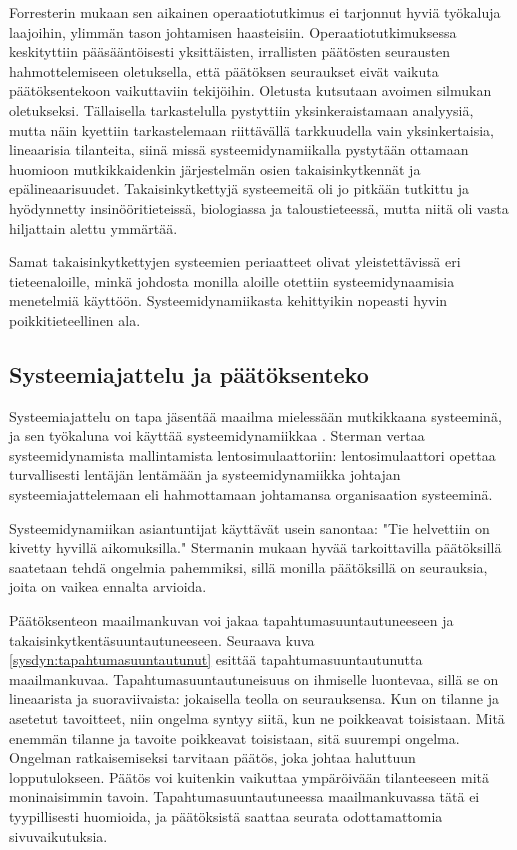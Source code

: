 \documentclass[finnish,12pt,a4paper,pdftex]{article}
\begin{document}
\begin{onehalfspacing}
Forresterin \cite[s. 398--399]{Forrester1968} mukaan sen aikainen operaatiotutkimus ei tarjonnut hyviä työkaluja laajoihin, ylimmän tason johtamisen haasteisiin. Operaatiotutkimuksessa keskityttiin pääsääntöisesti yksittäisten, irrallisten päätösten seurausten hahmottelemiseen oletuksella, että päätöksen seuraukset eivät vaikuta päätöksentekoon vaikuttaviin tekijöihin. Oletusta kutsutaan avoimen silmukan oletukseksi. Tällaisella tarkastelulla pystyttiin yksinkeraistamaan analyysiä, mutta näin kyettiin tarkastelemaan riittävällä tarkkuudella vain yksinkertaisia, lineaarisia tilanteita, siinä missä systeemidynamiikalla pystytään ottamaan huomioon mutkikkaidenkin järjestelmän osien takaisinkytkennät ja epälineaarisuudet. Takaisinkytkettyjä systeemeitä oli jo pitkään tutkittu ja hyödynnetty insinööritieteissä, biologiassa ja taloustieteessä, mutta niitä oli vasta hiljattain alettu ymmärtää. 

Samat takaisinkytkettyjen systeemien periaatteet olivat yleistettävissä eri tieteenaloille, minkä johdosta monilla aloille otettiin systeemidynaamisia menetelmiä käyttöön. Systeemidynamiikasta kehittyikin nopeasti hyvin poikkitieteellinen ala. \cite{WhatIsSystemDynamics, Forrester1968, Sterman2000} %



\subsection{Systeemiajattelu ja päätöksenteko \label{sysdyn:paatos}}

Systeemiajattelu on tapa jäsentää maailma mielessään mutkikkaana systeeminä, ja sen työkaluna voi käyttää systeemidynamiikkaa \cite[s. 4--5]{Sterman2000}. Sterman \cite[s. 4--5]{Sterman2000} vertaa systeemidynamista mallintamista lentosimulaattoriin: lentosimulaattori opettaa turvallisesti lentäjän lentämään ja systeemidynamiikka johtajan systeemiajattelemaan eli hahmottamaan johtamansa organisaation systeeminä. 

Systeemidynamiikan asiantuntijat käyttävät usein sanontaa: "Tie helvettiin on kivetty hyvillä aikomuksilla." Stermanin \cite[s. 5--6]{Sterman2000} mukaan hyvää tarkoittavilla päätöksillä saatetaan tehdä ongelmia pahemmiksi, sillä monilla päätöksillä on seurauksia, joita on vaikea ennalta arvioida. %

Päätöksenteon maailmankuvan voi jakaa tapahtumasuuntautuneeseen ja takaisinkytkentäsuuntautuneeseen. Seuraava kuva \ref{sysdyn:tapahtumasuuntautunut} esittää tapahtumasuuntautunutta maailmankuvaa. Tapahtumasuuntautuneisuus on ihmiselle luontevaa, sillä se on lineaarista ja suoraviivaista: jokaisella teolla on seurauksensa. Kun on tilanne ja asetetut tavoitteet, niin ongelma syntyy siitä, kun ne poikkeavat toisistaan. Mitä enemmän tilanne ja tavoite poikkeavat toisistaan, sitä suurempi ongelma. Ongelman ratkaisemiseksi tarvitaan päätös, joka johtaa haluttuun lopputulokseen. Päätös voi kuitenkin vaikuttaa ympäröivään tilanteeseen mitä moninaisimmin tavoin. Tapahtumasuuntautuneessa maailmankuvassa tätä ei tyypillisesti huomioida, ja päätöksistä saattaa seurata odottamattomia sivuvaikutuksia. \cite[s. 10]{Sterman2000}


\end{onehalfspacing}
\end{document}
